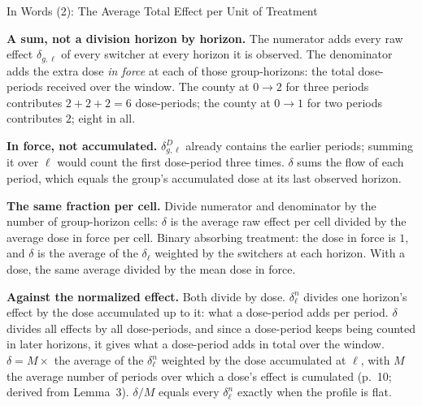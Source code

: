 \documentclass[main.tex]{subfiles}
\begin{document}
\begin{frame}{In Words (2): The Average Total Effect per Unit of Treatment}

  \footnotesize
  \textbf{A sum, not a division horizon by horizon.} The numerator adds every
  raw effect $\delta_{g,\ell}$ of every switcher at every horizon it is
  observed. The denominator adds the extra dose \emph{in force} at each of
  those group-horizons: the total dose-periods received over the window. The
  county at $0 \to 2$ for three periods contributes $2+2+2 = 6$ dose-periods;
  the county at $0 \to 1$ for two periods contributes $2$; eight in all.

  \medskip
  \textbf{In force, not accumulated.} $\delta^{D}_{g,\ell}$ already contains
  the earlier periods; summing it over $\ell$ would count the first
  dose-period three times. $\delta$ sums the flow of each period, which equals
  the group's accumulated dose at its last observed horizon.

  \medskip
  \textbf{The same fraction per cell.} Divide numerator and
  denominator by the number of group-horizon cells: $\delta$ is the average
  raw effect per cell divided by the average dose in force per cell. Binary
  absorbing treatment: the dose in force is $1$, and $\delta$ is the average of the
  $\delta_\ell$ weighted by the switchers at each horizon. With a dose, the
  same average divided by the mean dose in force.

  \medskip
  \textbf{Against the normalized effect.} Both divide by dose. $\delta^{n}_\ell$
  divides one horizon's effect by the dose accumulated up to it: what a
  dose-period adds per period. $\delta$ divides all effects by all
  dose-periods, and since a dose-period keeps being counted in later horizons,
  it gives what a dose-period adds in total over the window. $\delta = M
  \times$ the average of the $\delta^{n}_\ell$ weighted by the dose
  accumulated at $\ell$, with $M$ the average number of periods over which a
  dose's effect is cumulated (p.~10; derived from Lemma~3). $\delta/M$ equals
  every $\delta^{n}_\ell$ exactly when the profile is flat.

\end{frame}
\end{document}
